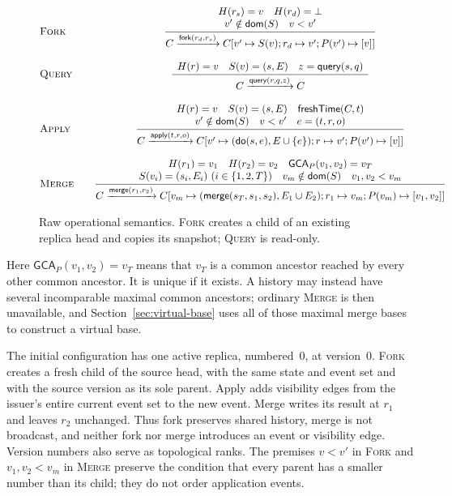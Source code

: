 \begin{figure}[H]
\footnotesize
\begingroup
\newcommand{\LeftRule}[3]{%
  \textsc{#1} &
  \displaystyle\frac{\begin{array}{c}#2\end{array}}{#3}}
\[
\begin{array}{@{}l@{\qquad}c@{}}
\LeftRule{Fork}{
  H(r_s)=v \quad H(r_d)=\bot
  \\
  v'\notin\mathsf{dom}(S) \quad v<v'
}{
  C\xrightarrow{\mathsf{fork}(r_d,r_s)}
  C[v'\mapsto S(v);r_d\mapsto v';P(v')\mapsto[v]]
}\\[2.2em]
\LeftRule{Query}{
  H(r)=v \quad S(v)=(s,E) \quad z=\mathsf{query}(s,q)
}{
  C\xrightarrow{\mathsf{query}(r,q,z)}C
}\\[2.2em]
\LeftRule{Apply}{
  H(r)=v \quad S(v)=(s,E) \quad \mathsf{freshTime}(C,t)
  \\
  v'\notin\mathsf{dom}(S) \quad v<v' \quad e=(t,r,o)
}{
  C\xrightarrow{\mathsf{apply}(t,r,o)}
  C[v'\mapsto(\mathsf{do}(s,e),E\cup\{e\});
    r\mapsto v';P(v')\mapsto[v]]
}\\[2.2em]
\LeftRule{Merge}{
  H(r_1)=v_1 \quad H(r_2)=v_2 \quad
  \mathsf{GCA}_P(v_1,v_2)=v_T
  \\
  S(v_i)=(s_i,E_i)\ (i\in\{1,2,T\}) \quad
  v_m\notin\mathsf{dom}(S) \quad v_1,v_2<v_m
}{
  C\xrightarrow{\mathsf{merge}(r_1,r_2)}
  C[v_m\mapsto(\merge(s_T,s_1,s_2),E_1\cup E_2);
    r_1\mapsto v_m;P(v_m)\mapsto[v_1,v_2]]
}
\end{array}
\]
\endgroup
\caption{Raw operational semantics. \textsc{Fork} creates a child of an
existing replica head and copies its snapshot; \textsc{Query} is read-only.}
\label{fig:raw-semantics}
\end{figure}

Here $\mathsf{GCA}_P(v_1,v_2)=v_T$ means that $v_T$ is a common ancestor
reached by every other common ancestor. It is unique if it exists. A history
may instead have several incomparable maximal common ancestors; ordinary
\textsc{Merge} is then unavailable, and Section~\ref{sec:virtual-base} uses all
of those maximal merge bases to construct a virtual base.

The initial configuration has one active replica, numbered~0, at version~0.
\textsc{Fork} creates a fresh child of the source head, with the same state and
event set and with the source version as its sole parent. Apply adds visibility
edges from the issuer's entire current event set to the new event. Merge writes
its result at $r_1$ and leaves $r_2$ unchanged. Thus fork preserves shared
history, merge is not broadcast, and neither fork nor merge introduces an
event or visibility edge. Version numbers also serve as topological ranks. The
premises $v<v'$ in \textsc{Fork} and $v_1,v_2<v_m$ in \textsc{Merge} preserve
the condition that every parent has a smaller number than its child; they do
not order application events.

